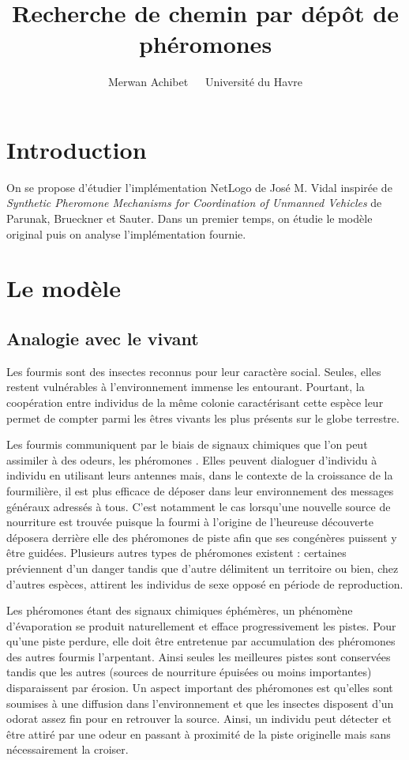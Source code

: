 \documentclass[12pt]{article}
\title{Recherche de chemin par dépôt de phéromones}
\author{Merwan Achibet $\;$ \textendash $\;$ Université du Havre}
\date{}
\begin{document}
\maketitle

\section*{Introduction}

On se propose d'étudier l'implémentation NetLogo de José M. Vidal
inspirée de \textit{Synthetic Pheromone Mechanisms for Coordination of
  Unmanned Vehicles} de Parunak, Brueckner et Sauter. Dans un premier
temps, on étudie le modèle original puis on analyse l'implémentation
fournie.

\section{Le modèle}

\subsection{Analogie avec le vivant}

Les fourmis sont des insectes reconnus pour leur caractère
social. Seules, elles restent vulnérables à l'environnement immense
les entourant. Pourtant, la coopération entre individus de la même
colonie caractérisant cette espèce leur permet de compter parmi les
êtres vivants les plus présents sur le globe terrestre.

Les fourmis communiquent par le biais de signaux chimiques que l'on
peut assimiler à des odeurs, les phéromones \cite{insectes}. Elles
peuvent dialoguer d'individu à individu en utilisant leurs antennes
mais, dans le contexte de la croissance de la fourmilière, il est plus
efficace de déposer dans leur environnement des messages généraux
adressés à tous. C'est notamment le cas lorsqu'une nouvelle source de
nourriture est trouvée puisque la fourmi à l'origine de l'heureuse
découverte déposera derrière elle des phéromones de piste afin que ses
congénères puissent y être guidées. Plusieurs autres types de
phéromones existent : certaines préviennent d'un danger tandis que
d'autre délimitent un territoire ou bien, chez d'autres espèces,
attirent les individus de sexe opposé en période de reproduction.

Les phéromones étant des signaux chimiques éphémères, un phénomène
d'évaporation se produit naturellement et efface progressivement les
pistes.  Pour qu'une piste perdure, elle doit être entretenue par
accumulation des phéromones des autres fourmis l'arpentant. Ainsi
seules les meilleures pistes sont conservées tandis que les autres
(sources de nourriture épuisées ou moins importantes) disparaissent
par érosion.  Un aspect important des phéromones est qu'elles sont
soumises à une diffusion dans l'environnement et que les insectes
disposent d'un odorat assez fin pour en retrouver la source. Ainsi, un
individu peut détecter et être attiré par une odeur en passant à
proximité de la piste originelle mais sans nécessairement la croiser.
\end{document}

